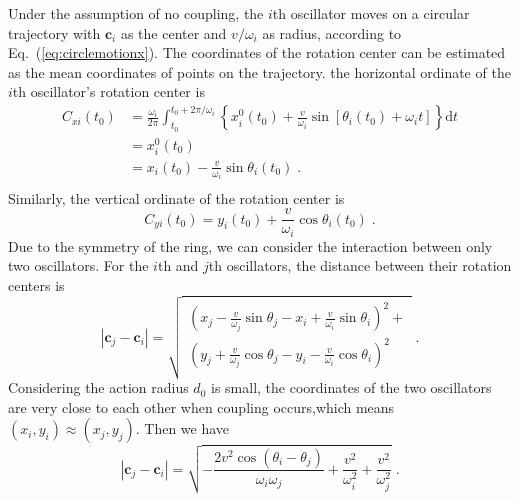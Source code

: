 \documentclass[%
 aip,
 amsmath,amssymb,
 reprint,%
]{revtex4-1}
\begin{document}
Under the assumption of no coupling, the $i$th oscillator moves on a circular trajectory with $\mathbf{c}_i$ as the center and $v/\omega_i$ as radius, according to Eq.~(\ref{eq:circlemotionx}).
The coordinates of the rotation center can be estimated as the mean coordinates of points on the trajectory.
the horizontal ordinate of the $i$th oscillator's rotation center is
\begin{equation}
    \begin{aligned}
        C_{xi}\left( t_0 \right) &=\frac{\omega _i}{2\pi}\int_{t_0}^{t_0+2\pi /\omega _i}{\left\{ x_{i}^{0}\left( t_0 \right) +\frac{v}{\omega _i}\sin \left[ \theta _i\left( t_0 \right) +\omega _it \right] \right\} \mathrm{d}t}\\
        &=x_{i}^{0}\left( t_0 \right)\\
        &=x_i\left( t_0 \right) -\frac{v}{\omega _i}\sin \theta _i\left( t_0 \right)\;.\\
    \end{aligned}
\end{equation}
Similarly, the vertical ordinate of the rotation center is
\begin{equation}
    C_{yi}\left( t_0 \right) =y_i\left( t_0 \right) +\frac{v}{\omega _i}\cos \theta _i\left( t_0 \right)\;.
\end{equation}
Due to the symmetry of the ring, we can consider the interaction between only two oscillators. For the $i$th and $j$th oscillators, the distance between their rotation centers is
\begin{equation}\label{eq:distanceCenter}
    \left| \mathbf{c}_j-\mathbf{c}_i \right|=\sqrt{\begin{array}{l}
        \left( x_j-\frac{v}{\omega _j}\sin \theta _j-x_i+\frac{v}{\omega _i}\sin \theta _i \right) ^2+\\
        \left( y_j+\frac{v}{\omega _j}\cos \theta _j-y_i-\frac{v}{\omega _i}\cos \theta _i \right) ^2\\
    \end{array}}\;.
\end{equation}
Considering the action radius $d_0$ is small, the coordinates of the two oscillators are very close to each other when coupling occurs,which means $(x_i, y_i) \approx (x_j, y_j)$. Then we have
\begin{equation}
    \left| \mathbf{c}_j-\mathbf{c}_i \right|=\sqrt{-\frac{2v^2\cos \left( \theta _i-\theta _j \right)}{\omega _i\omega _j}+\frac{v^2}{\omega _{i}^{2}}+\frac{v^2}{\omega _{j}^{2}}}\;.
\end{equation}
\end{document}
